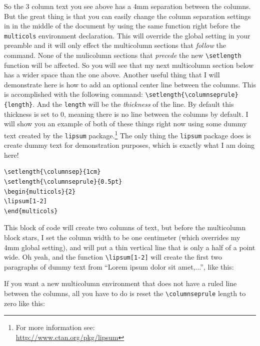 \documentclass{article}
\newcommand{\nid}{\noindent} %
\begin{document}
\nid So the 3 column text you see above has a 4mm separation between the columns. But the great thing is that you can easily change the column separation settings in in the middle of the document by using the same function right before the \verb|multicols| environment declaration.  This will override the global setting in your preamble and it will only effect the multicolumn sections that \emph{follow} the command. None of the mulicolumn sections that \emph{precede} the new \verb|\setlength| function will be affected.   So you will see that my next multicolumn section below has a wider space than the one above.  Another useful thing that I will demonstrate here is  how to add an optional center line between the columns.  This is accomplished with the following command: \verb|\setlength{\columnseprule}{length}|.  And the \verb|length| will be the \textit{thickness} of the line.  By default this thickness is set to 0, meaning there is no line between the columns by default.  I will show you an example of both of these things right now using some dummy text created by the \verb|lipsum| package.\footnote{For more information see:\\\url{http://www.ctan.org/pkg/lipsum}}  The only thing the \verb|lipsum| package does is create dummy text for demonstration purposes, which is exactly what I am doing here!  

\begin{verbatim}
\setlength{\columnsep}{1cm}
\setlength{\columnseprule}{0.5pt}
\begin{multicols}{2}
\lipsum[1-2]
\end{multicols}
\end{verbatim}

\nid This block of code will create two columns of text, but before the multicolumn block stars, I set the column width to be one centimeter (which overrides my 4mm global setting), and will put a thin vertical line that is only a half of a point wide.  Oh yeah, and the function \verb|\lipsum[1-2]| will create the first two paragraphs of dummy text from ``Lorem ipsum dolor sit amet,...'', like this:

\setlength{\columnsep}{1cm}
\setlength{\columnseprule}{0.5pt}
\begin{multicols}{2}
\lipsum[1-2]
\end{multicols}

\nid If you want a new multicolumn environment that does not have a ruled line between the columns, all you have to do is reset the \verb|\columnseprule| length to zero like this:
\end{document}
